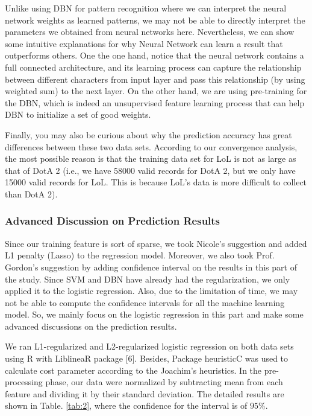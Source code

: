 \documentclass{article} %
\begin{document}
Unlike using DBN for pattern recognition where we can interpret the neural network weights as learned patterns, we may not be able to directly interpret the parameters we obtained from neural networks here. Nevertheless, we can show some intuitive explanations for why Neural Network can learn a result that outperforms others. One the one hand, notice that the neural network contains a full connected architecture, and its learning process can capture the relationship between different characters from input layer and pass this relationship (by using weighted sum) to the next layer. On the other hand, we are using pre-training for the DBN, which is indeed an unsupervised feature learning process that can help DBN to initialize a set of good weights.

Finally, you may also be curious about why the prediction accuracy has great differences between these two data sets. According to our convergence analysis, the most possible reason is that the training data set for LoL is not as large as that of DotA 2 (i.e., we have 58000 valid records for DotA 2, but we only have 15000 valid records for LoL. This is because LoL's data is more difficult to collect than DotA 2). %

\subsubsection{Advanced Discussion on Prediction Results}

Since our training feature is sort of sparse, we took Nicole's suggestion and added L1 penalty (Lasso) to the regression model. Moreover, we also took Prof. Gordon's suggestion by adding confidence interval on the results in this part of the study. Since SVM and DBN have already had the regularization, we only applied it to the logistic regression. Also, due to the limitation of time, we may not be able to compute the confidence intervals for all the machine learning model. So, we mainly focus on the logistic regression in this part and make some advanced discussions on the prediction results.

We ran L1-regularized and L2-regularized logistic regression on both data sets using R with LiblineaR package [6]. Besides, Package heuristicC was used to calculate cost parameter according to the Joachim's heuristics. In the pre-processing phase, our data were normalized by subtracting mean from each feature and dividing it by their standard deviation. The detailed results are shown in Table. \ref{tab:2}, where the confidence for the interval is of $95\%$.
\end{document}
